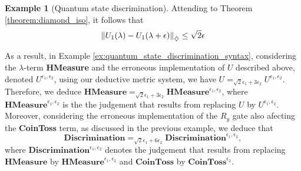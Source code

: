 \documentclass[10pt,a4paper]{amsart}
\theoremstyle{definition}
\theoremstyle{definition}
\newtheorem{example}[definition]{Example}
\theoremstyle{definition}
\theoremstyle{definition}
\theoremstyle{definition}
\theoremstyle{definition}
\begin{document}
\begin{example}[Quantum state discrimination]
Attending to Theorem \ref{theorem:diamond_iso}, it follows that
  \begin{align*}
    \left\lVert U_1(\lambda)- U_1(\lambda + \epsilon)  \right\rVert_{\diamondsuit} \leq \sqrt{2} \epsilon
  \end{align*}


As a result, in  Example \ref{ex:quantum_state_discrimination_syntax}, considering the $\lambda$-term \textbf{HMeasure} and the erroneous implementation of $U$ described above, denoted $U^{\epsilon_1, \epsilon_2}$, using our deductive metric system, we have $U =_{\sqrt{2}\epsilon_1+ 3\epsilon_2} U^{\epsilon_1, \epsilon_2}$. Therefore, we deduce $\textbf{HMeasure} =_{\sqrt{2}\epsilon_1+ 3\epsilon_2} \textbf{HMeasure}^{\epsilon_1, \epsilon_2}$, where $\textbf{HMeasure}^{\epsilon_1, \epsilon_2}$ is the the judgement that results from replacing $U$ by $U^{\epsilon_1, \epsilon_2}$. Moreover, considering the erroneous implementation of the $R_y$ gate also afecting the \textbf{CoinToss} term, as discussed in the previous example, we deduce that 
$$\textbf{Discrimination} =_{\sqrt{2}\epsilon_1+6\epsilon_2} \textbf{Discrimination}^{\epsilon_1,\epsilon_2}, $$
where $\textbf{Discrimination}^{\epsilon_1,\epsilon_2}$ denotes the judgement that results from replacing $\textbf{HMeasure}$ by $\textbf{HMeasure}^{\epsilon_1, \epsilon_2}$ and $\textbf{CoinToss}$ by  $\textbf{CoinToss}^{\epsilon_2}$.

\end{example}
\end{document}
